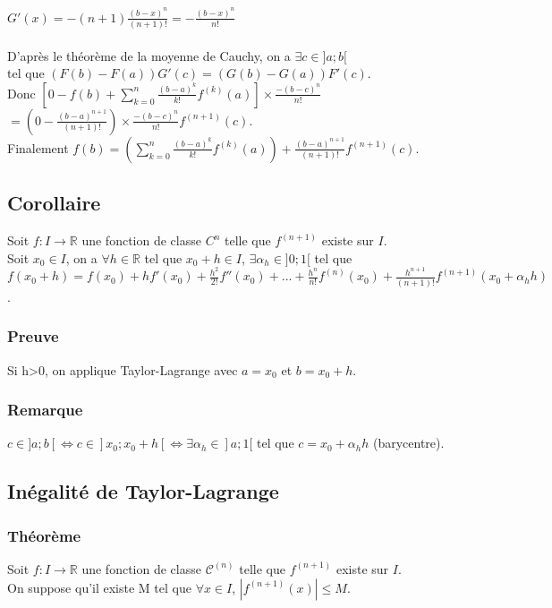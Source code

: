 \documentclass[a4paper,10pt]{book} %
\newcommand{\R}{\mathbb{R}}
\begin{document}
$G'(x)=-(n+1)\frac{(b-x)^n}{(n+1)!}=-\frac{(b-x)^n}{n!}$\\\\

D'après le théorème de la moyenne de Cauchy, on a $\exists c\in ]a;b[$\\
tel que $(F(b)-F(a))G'(c)=(G(b)-G(a))F'(c)$.\\

Donc $\left[0-f(b)+\sum\limits_{k=0}^n \frac{(b-a)^k}{k!}f^{(k)}(a)\right]\times \frac{-(b-c)^n}{n!}$
$=(0-\frac{(b-a)^{n+1}}{(n+1)!})\times \frac{-(b-c)^n}{n!}f^{(n+1)}(c)$.\\

Finalement $f(b)=(\sum\limits_{k=0}^n \frac{(b-a)^k}{k!}f^{(k)}(a))+\frac{(b-a)^{n+1}}{(n+1)!}f^{(n+1)}(c)$.

\subsection{Corollaire}
Soit $f:I\rightarrow \R$ une fonction de classe ${C}^n$ telle que $f^{(n+1)}$ existe sur $I$.\\

Soit $x_0\in I$, on a $\forall h\in \R$ tel que $x_0+h\in I$, $\exists \alpha_h \in ]0;1[$ tel que\\
$f(x_0+h)=f(x_0)+hf'(x_0)+\frac{h^2}{2!}f''(x_0)+...+\frac{h^n}{n!}f^{(n)}(x_0)+\frac{h^{n+1}}{(n+1)!}f^{(n+1)}(x_0+\alpha_h h)$.

\subsubsection{Preuve}
Si h>0, on applique Taylor-Lagrange avec $a=x_0$ et $b=x_0+h$.

\subsubsection{Remarque}
$c\in ]a;b[ \Leftrightarrow c\in ]x_0;x_0+h[ \Leftrightarrow \exists \alpha_h\in ]a;1[$ tel que $c=x_0+\alpha_h h$ (barycentre).

\subsection{Inégalité de Taylor-Lagrange}
\subsubsection{Théorème}
Soit $f : I\rightarrow \R$ une fonction de classe $\mathcal{C}^{(n)}$ telle que $f^{(n+1)}$ existe sur $I$.\\
On suppose qu'il existe M tel que $\forall x\in I$, $|f^{(n+1)}(x)|\leq M$.\\
\end{document}
